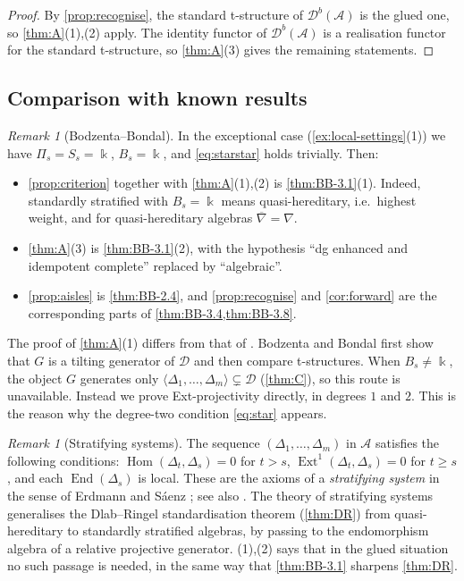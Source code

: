\documentclass[11pt,reqno]{amsart}
\theoremstyle{plain}
\theoremstyle{definition}
\theoremstyle{remark}
\newtheorem{remark}[theorem]{Remark}
\newcommand{\kk}{\Bbbk}
\DeclareMathOperator{\Hom}{Hom}
\DeclareMathOperator{\End}{End}
\DeclareMathOperator{\Ext}{Ext}
\newcommand{\Db}{\mathcal{D}^b}
\newcommand{\thick}[1]{\langle #1\rangle}
\newcommand{\nablabar}{\overline{\nabla}}
\newcommand{\cD}{\mathcal{D}}
\newcommand{\cA}{\mathcal{A}}
\begin{document}
\begin{proof}
By \cref{prop:recognise}, the standard t-structure of $\Db(\cA)$ is the glued one, so \cref{thm:A}(1),(2) apply. The identity functor of $\Db(\cA)$ is a realisation functor for the standard t-structure, so \cref{thm:A}(3) gives the remaining statements.
\end{proof}

\subsection{Comparison with known results}

\begin{remark}[Bodzenta--Bondal]\label{rem:compare-BB}
In the exceptional case (\cref{ex:local-settings}(1)) we have $\Pi_s=S_s=\kk$, $B_s=\kk$, and \eqref{eq:starstar} holds trivially. Then:
\begin{itemize}
\item \cref{prop:criterion} together with \cref{thm:A}(1),(2) is \cref{thm:BB-3.1}(1). Indeed, standardly stratified with $B_s=\kk$ means quasi-hereditary, i.e.\ highest weight, and for quasi-hereditary algebras $\nablabar=\nabla$.
\item \cref{thm:A}(3) is \cref{thm:BB-3.1}(2), with the hypothesis ``dg enhanced and idempotent complete'' replaced by ``algebraic''.
\item \cref{prop:aisles} is \cref{thm:BB-2.4}, and \cref{prop:recognise} and \cref{cor:forward} are the corresponding parts of \cref{thm:BB-3.4,thm:BB-3.8}.
\end{itemize}
The proof of \cref{thm:A}(1) differs from that of \cite{BB26}. Bodzenta and Bondal first show that $G$ is a tilting generator of $\cD$ and then compare t-structures. When $B_s\neq\kk$, the object $G$ generates only $\thick{\Delta_1,\dots,\Delta_m}\subsetneq\cD$ (\cref{thm:C}), so this route is unavailable. Instead we prove Ext-projectivity directly, in degrees $1$ and $2$. This is the reason why the degree-two condition \eqref{eq:star} appears.
\end{remark}

\begin{remark}[Stratifying systems]
The sequence $(\Delta_1,\dots,\Delta_m)$ in $\cA$ satisfies the following conditions: $\Hom(\Delta_t,\Delta_s)=0$ for $t>s$, $\Ext^1(\Delta_t,\Delta_s)=0$ for $t\ge s$, and each $\End(\Delta_s)$ is local. These are the axioms of a \emph{stratifying system} in the sense of Erdmann and S\'aenz \cite{ES03}; see also \cite{MMS04}. The theory of stratifying systems generalises the Dlab--Ringel standardisation theorem (\cref{thm:DR}) from quasi-hereditary to standardly stratified algebras, by passing to the endomorphism algebra of a relative projective generator. (1),(2) says that in the glued situation no such passage is needed, in the same way that \cref{thm:BB-3.1} sharpens \cref{thm:DR}.
\end{remark}
\end{document}
